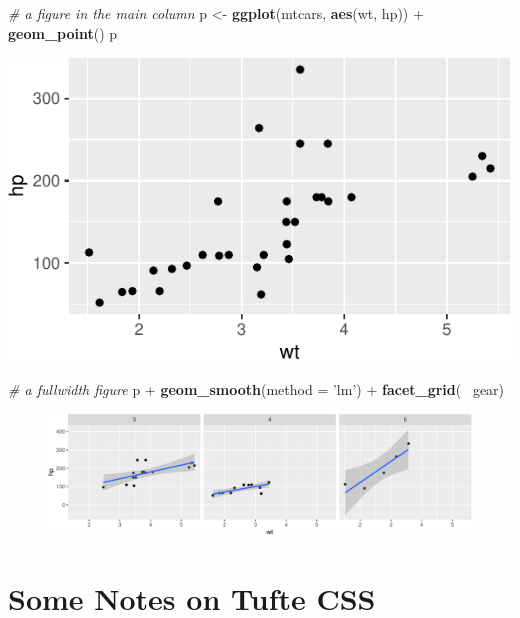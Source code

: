\documentclass[]{tufte-handout}
\newenvironment{Shaded}{}{}
\newcommand{\KeywordTok}[1]{\textcolor[rgb]{0.00,0.44,0.13}{\textbf{#1}}}
\newcommand{\DataTypeTok}[1]{\textcolor[rgb]{0.56,0.13,0.00}{#1}}
\newcommand{\StringTok}[1]{\textcolor[rgb]{0.25,0.44,0.63}{#1}}
\newcommand{\CommentTok}[1]{\textcolor[rgb]{0.38,0.63,0.69}{\textit{#1}}}
\newcommand{\OperatorTok}[1]{\textcolor[rgb]{0.40,0.40,0.40}{#1}}
\newcommand{\NormalTok}[1]{#1}
\begin{document}
\begin{Shaded}
\begin{Highlighting}[]
\CommentTok{# a figure in the main column}
\NormalTok{p <-}\StringTok{ }\KeywordTok{ggplot}\NormalTok{(mtcars, }\KeywordTok{aes}\NormalTok{(wt, hp)) }\OperatorTok{+}\StringTok{ }\KeywordTok{geom_point}\NormalTok{()}
\NormalTok{p}
\end{Highlighting}
\end{Shaded}

\includegraphics{handout-twitter-analysis_files/figure-latex/fig-nocap-main-1}

\begin{Shaded}
\begin{Highlighting}[]
\CommentTok{# a fullwidth figure}
\NormalTok{p }\OperatorTok{+}\StringTok{ }\KeywordTok{geom_smooth}\NormalTok{(}\DataTypeTok{method =} \StringTok{'lm'}\NormalTok{) }\OperatorTok{+}\StringTok{ }\KeywordTok{facet_grid}\NormalTok{(}\OperatorTok{~}\StringTok{ }\NormalTok{gear)}
\end{Highlighting}
\end{Shaded}

\begin{figure}
\includegraphics{handout-twitter-analysis_files/figure-latex/fig-nocap-fullwidth-1} \end{figure}

\section{Some Notes on Tufte CSS}\label{some-notes-on-tufte-css}
\end{document}

